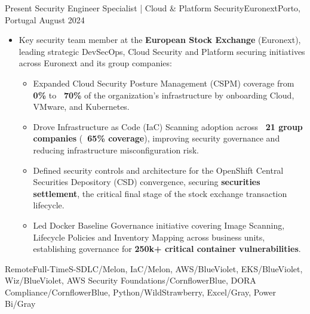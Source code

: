 %
%
%
\begin{experiences}

  \experience
  {Present} {Security Engineer Specialist | Cloud \& Platform Security}{Euronext}{Porto, Portugal}
  {August 2024}{
  \begin{itemize}
    \item Key security team member at the \textbf{European Stock Exchange} (Euronext), leading strategic DevSecOps, Cloud Security and Platform securing initiatives across Euronext and its group companies:
    \begin{itemize}
      \item Expanded Cloud Security Posture Management (CSPM) coverage from \textbf{0\%} to \textbf{~70\%} of the organization's infrastructure by onboarding Cloud, VMware, and Kubernetes.
      \item Drove Infrastructure as Code (IaC) Scanning adoption across \textbf{~21 group companies} (\textbf{~65\% coverage}), improving security governance and reducing infrastructure misconfiguration risk.
      \item Defined security controls and architecture for the OpenShift Central Securities Depository (CSD) convergence, securing \textbf{securities settlement}, the critical final stage of the stock exchange transaction lifecycle.
      \item Led Docker Baseline Governance initiative covering Image Scanning, Lifecycle Policies and Inventory Mapping across business units, establishing governance for \textbf{250k+ critical container vulnerabilities}.
    \end{itemize}
  \end{itemize}}
  {Remote}{Full-Time}{S-SDLC/Melon, IaC/Melon, AWS/BlueViolet, EKS/BlueViolet, Wiz/BlueViolet, AWS Security Foundations/CornflowerBlue, DORA Compliance/CornflowerBlue, Python/WildStrawberry, Excel/Gray, Power Bi/Gray}
  
  \emptySeparator


\end{experiences}
